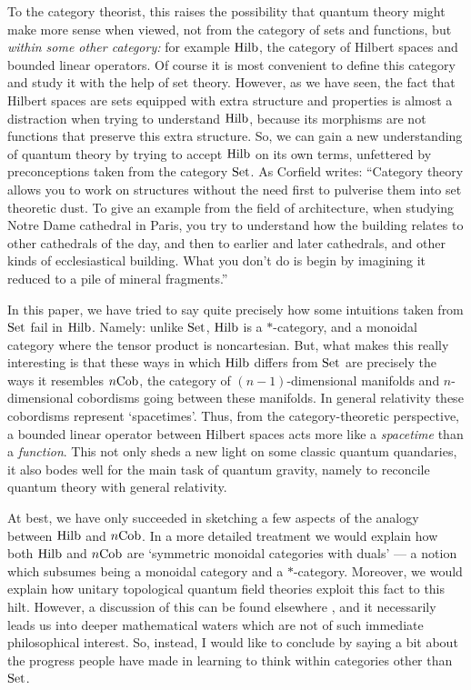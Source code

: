 \documentclass[12pt]{article}
\newcommand{\Set}{{\rm Set}}
\newcommand{\Hilb}{{\rm Hilb}}
\newcommand{\Cob}{{\rm Cob}}
\begin{document}
To the category theorist, this raises the possibility that
quantum theory might make more sense when viewed, not from
the category of sets and functions, but {\sl within some other category:} 
for example $\Hilb$, the category of Hilbert spaces and bounded 
linear operators.  Of course it is most convenient to define this 
category and study it with the help of set theory.  However, as we
have seen, the fact that Hilbert spaces are sets equipped with extra
structure and properties is almost a distraction when trying to 
understand $\Hilb$, because its morphisms are not functions that
preserve this extra structure.   So, we can gain a new understanding
of quantum theory by trying to accept $\Hilb$ on its own terms, 
unfettered by preconceptions taken from the category $\Set$.  As 
Corfield \cite{Corfield} writes: ``Category theory allows you to work 
on structures without the need first to pulverise them into set 
theoretic dust.  To give an example from the field of architecture, 
when studying Notre Dame cathedral in Paris, you try to understand how 
the building relates to other cathedrals of the day, and then to earlier 
and later cathedrals, and other kinds of ecclesiastical building.  
What you don't do is begin by imagining it reduced to a pile
of mineral fragments.''

In this paper, we have tried to say quite precisely how some intuitions 
taken from $\Set$ fail in $\Hilb$.   Namely: unlike $\Set$, $\Hilb$ 
is a $\ast$-category, and a monoidal category where the tensor product
is noncartesian.  But, what makes this really interesting is that these 
ways in which $\Hilb$ differs from $\Set$ are precisely the ways 
it resembles $n\Cob$, the category of $(n-1)$-dimensional 
manifolds and $n$-dimensional cobordisms going between these
manifolds.  In general relativity these cobordisms represent 
`spacetimes'.  Thus, from the category-theoretic perspective, a 
bounded linear operator between Hilbert spaces acts more like a 
{\it spacetime} than a {\it function}.  This not only sheds a new light 
on some classic quantum quandaries, it also bodes well for the main 
task of quantum gravity, namely to reconcile quantum theory with general
relativity.

At best, we have only succeeded in sketching a few aspects of the
analogy between $\Hilb$ and $n\Cob$.  In
a more detailed treatment we would explain how both $\Hilb$ and
$n\Cob$ are `symmetric monoidal categories with duals' --- a notion
which subsumes being a monoidal category and a $\ast$-category.
Moreover, we would explain how unitary topological quantum field
theories exploit this fact to this hilt.  However, a discussion of
this can be found elsewhere \cite{BD}, and it necessarily leads
us into deeper mathematical waters which are not of such immediate
philosophical interest.  So, instead, I would like to conclude by
saying a bit about the progress people have made in learning to
think within categories other than $\Set$.
\end{document}
